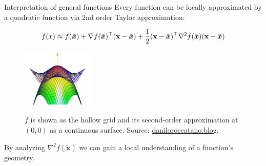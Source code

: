 \documentclass[11pt,compress,t,notes=noshow, xcolor=table]{beamer}
\begin{document}
  \begin{vbframe}{Interpretation of general functions}
  Every function can be locally approximated by a quadratic function via 2nd order Taylor approximation: 
  
  \vspace*{-0.3cm}
  
  $$
  f(x) \approx f(\bm{\tilde{x}}) + \nabla f(\bm{\tilde{x}})^\top(\mathbf{x}-\bm{\tilde{x}}) +
  \frac 12(\mathbf{x}-\bm{\tilde{x}})^\top\nabla^2 f(\bm{\tilde{x}})(\mathbf{x}-\bm{\tilde{x}})
  $$
  
  \begin{figure}
    \includegraphics[width=0.3\textwidth]{figure_man/taylor_2D_quadratic.png} \\
    \begin{footnotesize} 
    $f$ is shown as the hollow grid and its second-order approximation at $(0, 0)$ as a continuous surface. Source: \url{daniloroccatano.blog}. 
    \end{footnotesize}
  \end{figure}
  
  By analyzing $\nabla^2 f(\bm{\tilde{x}})$ we can gain a local understanding of a function's geometry. 
  
  \end{vbframe}
  
  
  
  \endlecture
\end{document}
